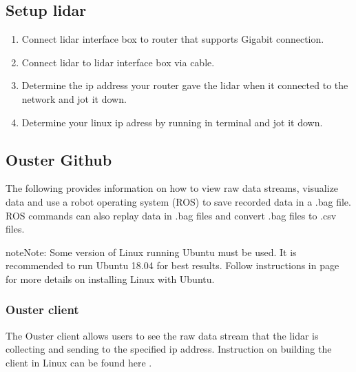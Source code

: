 \documentclass[letterpaper,10pt,english]{sphinxmanual}
\begin{document}
\subsection{Setup lidar}
\label{\detokenize{Ouster lidar:setup-lidar}}\begin{enumerate}
\def\theenumi{\arabic{enumi}}
\def\labelenumi{\theenumi .}
\makeatletter\def\p@enumii{\p@enumi \theenumi .}\makeatother
\item {} 
Connect lidar interface box to router that supports Gigabit connection.

\item {} 
Connect lidar to lidar interface box via cable.

\item {} 
Determine the ip address your router gave the lidar when it connected to the network and jot it down.

\item {} 
Determine your linux ip adress by running  in terminal and jot it down.

\end{enumerate}


\subsection{Ouster Github}
\label{\detokenize{Ouster lidar:ouster-github}}
The following  provides information on how to view raw data streams, visualize data and use a robot operating system (ROS) to save recorded data in a .bag file.
ROS commands can also replay data in .bag files and convert .bag files to .csv files.

\begin{sphinxadmonition}{note}{Note:}
Some version of Linux running Ubuntu must be used. It is recommended to run Ubuntu 18.04 for best results. Follow instructions in  page for more details on installing Linux with Ubuntu.
\end{sphinxadmonition}


\subsubsection{Ouster client}
\label{\detokenize{Ouster lidar:ouster-client}}
The Ouster client allows users to see the raw data stream that the lidar is collecting and sending to the specified ip address.
Instruction on building the client in Linux can be found here .
\end{document}
